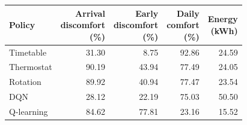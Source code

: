 \begin{tabular}{@{}lrrrr@{}}
\toprule
Policy & \shortstack{Arrival\\discomfort\\(\%)} & \shortstack{Early\\discomfort\\(\%)} & \shortstack{Daily\\comfort\\(\%)} & \shortstack{Energy\\(kWh)}\\
\midrule
Timetable & 31.30 & 8.75 & 92.86 & 24.59\\
Thermostat & 90.19 & 43.94 & 77.49 & 24.05\\
Rotation & 89.92 & 40.94 & 77.47 & 23.54\\
DQN & 28.12 & 22.19 & 75.03 & 50.50\\
Q-learning & 84.62 & 77.81 & 23.16 & 15.52\\
\bottomrule
\end{tabular}
